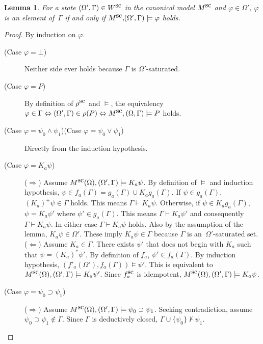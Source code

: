 \documentclass[doctor]{iscs-thesis}
\newtheorem{lemma}{Lemma}
\begin{document}
\begin{lemma}
\label{exact}
 For a state $(\Omega',\Gamma)\in W^{\mbox{sc}}$ in the canonical model $M^{\mbox{sc}}$
 and $\varphi\in\Omega'$,
 $\varphi$ is an element of~$\Gamma$
 if and only if
 $M^{\mbox{sc}},\kern-2pt (\Omega',\Gamma)\models\varphi$ holds.
\end{lemma}
\begin{proof}
 By induction on $\varphi$.
\begin{description}
 \item[(Case $\varphi=\bot$)] Neither side ever holds because $\Gamma$ is $\Omega'$-saturated.
 \item[(Case $\varphi =P$)]
	    By definition of $\rho^{\mbox{sc}}$ and $\models$, the equivalency
	    $\varphi\in\Gamma\Leftrightarrow(\Omega',\Gamma)\in\rho(P)\Leftrightarrow
	    M^{\mbox{sc}},(\Omega,\Gamma)\models P$ holds.
 \item[(Case $\varphi = \psi_0\wedge\psi_1$)(Case $\varphi = \psi_0\vee\psi_1$)]
	    Directly from the induction hypothesis.
 \item[(Case $\varphi ={K_a} \psi$)]
	    \newcommand{\modelion}[2]{\canon M(\Omega), #1\models #2}
	    ($\Rightarrow$)
	    Assume $\modelion{(\Omega',\Gamma)}{K_a\psi}$.
	    By definition of $\models$ and induction hypothesis,
	    $\psi\in f_a(\Gamma)=g_a(\Gamma)\cup K_ag_a(\Gamma)$.
	    If $\psi\in g_a(\Gamma)$,
	    $(K_a)^+\psi\in\Gamma$ holds.
	    This means $\Gamma\vdash K_a\psi$.
	    Otherwise, if $\psi\in K_ag_a(\Gamma)$,
	    $\psi = K_a\psi'$ where $\psi'\in g_a(\Gamma)$.
	    This means $\Gamma\vdash K_a\psi'$ and consequently
	    $\Gamma\vdash K_a\psi$.
	    In either case $\Gamma\vdash K_a\psi$ holds.
	    Also by the assumption of the lemma, $K_a\psi\in\Omega'$.
	    These imply $K_a\psi\in\Gamma$ because
	    $\Gamma$ is an~$\Omega'$-saturated set.
	    \\
	    ($\Leftarrow$)
	    Assume $K_a\in\Gamma$.
	    There exists $\psi'$ that does not begin with $K_a$
	    such that $\psi = (K_a)^*\psi'$.
	    By definition of $f_a$, $\psi'\in f_a(\Gamma)$.
	    By induction hypothesis, $(f'_a(\Omega'), f_a(\Gamma))\models \psi'$.
	    This is equivalent to $M^{\mbox{sc}}(\Omega), (\Omega', \Gamma)\models K_a\psi'$.
	    Since $f^{\mbox{sc}}_a$ is idempotent, $M^{\mbox{sc}}(\Omega), (\Omega', \Gamma)\models K_a\psi$.
 \item[(Case $\varphi = \psi_0\supset\psi_1$)]
	    ($\Rightarrow$) Assume $\modelion {(\Omega',\Gamma)} {\psi_0\supset\psi_1}$.
	    Seeking contradiction, assume $\psi_0\supset\psi_1\notin \Gamma$.
	    Since $\Gamma$ is deductively closed, $\Gamma\cup\{\psi_0\}\not\vdash\psi_1$.

\end{description}
\end{proof}
\end{document}
